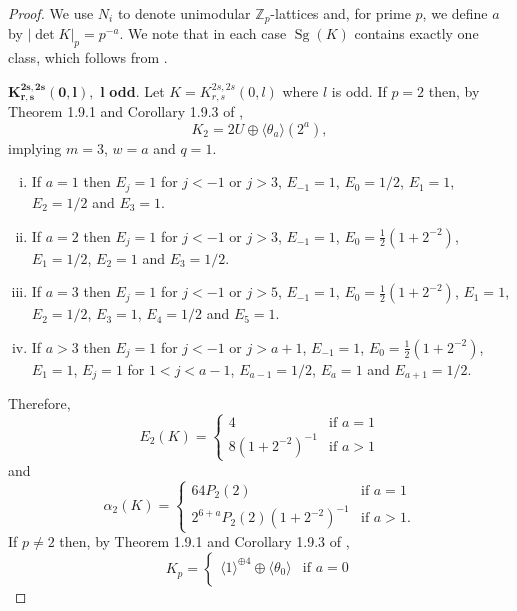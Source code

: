 \documentclass[12pt, a4paper]{article}
\newcommand{\ZZ}{\mathbb{Z}}
\newcommand{\la}{\langle}
\newcommand{\ra}{\rangle}
\newcommand{\opn}{\operatorname}
\newcommand{\op}{\oplus}
\begin{document}
\begin{proof}
We use $N_i$ to denote unimodular $\ZZ_p$-lattices and, for prime $p$, we define $a$ by $\vert \opn{det} K \vert_p = p^{-a}$.
  We note that in each case $\opn{Sg}(K)$ contains exactly one class, which follows from \cite[Theorem 1.13.2]{Nikulin}.

  \noindent $\mathbf{K^{2s,2s}_{r,s}(0,l)},$ $\mathbf{l}$ \textbf{odd}. 
  Let $K = K^{2s, 2s}_{r,s}(0,l)$ where $l$ is odd.
  If $p=2$ then, by Theorem 1.9.1 and  Corollary 1.9.3 of \cite{Nikulin},
  \begin{equation*}
    K_2 = 2U \op \la \theta_a \ra (2^a), 
  \end{equation*}
  implying $m=3$, $w=a$ and $q=1$.
  \begin{enumerate}[(i)]
  \item If $a=1$ then
  $E_j=1$ for $j<-1$ or $j>3$,
  $E_{-1}=1$,
  $E_0 = 1/2$,
  $E_1 = 1$,
  $E_2 = 1/2$ and
  $E_3 = 1$.
\item  If $a=2$ then
  $E_j=1$ for $j<-1$ or $j>3$, 
  $E_{-1}=1$,
  $E_0=\frac{1}{2}(1+2^{-2})$,
  $E_1=1/2$,
  $E_2=1$ and
  $E_3=1/2$. 
\item If $a=3$ then
  $E_j = 1$ for $j<-1$ or $j>5$,
  $E_{-1}=1$,
  $E_0 = \frac{1}{2}(1 + 2^{-2})$,
  $E_1=1$,
  $E_2=1/2$,
  $E_3=1$,
  $E_4=1/2$ and
  $E_5=1$. 
\item   If $a>3$ then
  $E_j = 1$ for $j <-1$ or $j>a+1$,
  $E_{-1}=1$,
  $E_0 = \frac{1}{2}(1 + 2^{-2})$,
  $E_1 = 1$,
  $E_j = 1$ for $1<j<a-1$,
  $E_{a-1} = 1/2$,
  $E_a = 1$ and
  $E_{a+1} = 1/2$. 
\end{enumerate}
  Therefore,
  \[ 
  E_2(K) =
    \begin{cases}
      4 & \text{if $a=1$} \\
      8(1+2^{-2})^{-1} & \text{if $a>1$} 
    \end{cases}
\]
    and     
  \begin{equation}\label{K2s2sr0l,odd}
    \alpha_2(K) =
    \begin{cases}
      64 P_2(2) & \text{if $a=1$} \\
      2^{6+a} P_2(2) (1+2^{-2})^{-1} & \text{if $a>1$.}
    \end{cases}
  \end{equation}
  If $p \neq 2$ then, by Theorem 1.9.1 and  Corollary 1.9.3 of \cite{Nikulin},
  \begin{equation}\label{Kp}
    K_p =
    \begin{cases}
      \la 1 \ra^{\op 4} \op \la \theta_0 \ra & \text{if $a =0$} \\

\end{cases}
\end{equation}
\end{proof}
\end{document}
